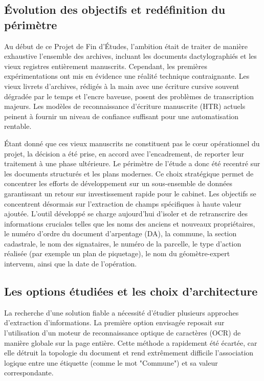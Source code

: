 \documentclass[a4paper,11pt]{article}
\begin{document}
\subsection{Évolution des objectifs et redéfinition du périmètre}
Au début de ce Projet de Fin d'Études, l'ambition était de traiter de manière exhaustive l'ensemble des archives, incluant les documents dactylographiés et les vieux registres entièrement manuscrits. Cependant, les premières expérimentations ont mis en évidence une réalité technique contraignante. Les vieux livrets d'archives, rédigés à la main avec une écriture cursive souvent dégradée par le temps et l'encre baveuse, posent des problèmes de transcription majeurs. Les modèles de reconnaissance d'écriture manuscrite (HTR) actuels peinent à fournir un niveau de confiance suffisant pour une automatisation rentable. 

Étant donné que ces vieux manuscrits ne constituent pas le cœur opérationnel du projet, la décision a été prise, en accord avec l'encadrement, de reporter leur traitement à une phase ultérieure. Le périmètre de l'étude a donc été recentré sur les documents structurés et les plans modernes. Ce choix stratégique permet de concentrer les efforts de développement sur un sous-ensemble de données garantissant un retour sur investissement rapide pour le cabinet. Les objectifs se concentrent désormais sur l'extraction de champs spécifiques à haute valeur ajoutée. L'outil développé se charge aujourd'hui d'isoler et de retranscrire des informations cruciales telles que les noms des anciens et nouveaux propriétaires, le numéro d'ordre du document d'arpentage (DA), la commune, la section cadastrale, le nom des signataires, le numéro de la parcelle, le type d'action réalisée (par exemple un plan de piquetage), le nom du géomètre-expert intervenu, ainsi que la date de l'opération.

\subsection{Les options étudiées et les choix d'architecture}
La recherche d'une solution fiable a nécessité d'étudier plusieurs approches d'extraction d'informations. La première option envisagée reposait sur l'utilisation d'un moteur de reconnaissance optique de caractères (OCR) de manière globale sur la page entière. Cette méthode a rapidement été écartée, car elle détruit la topologie du document et rend extrêmement difficile l'association logique entre une étiquette (comme le mot "Commune") et sa valeur correspondante. 
\end{document}
